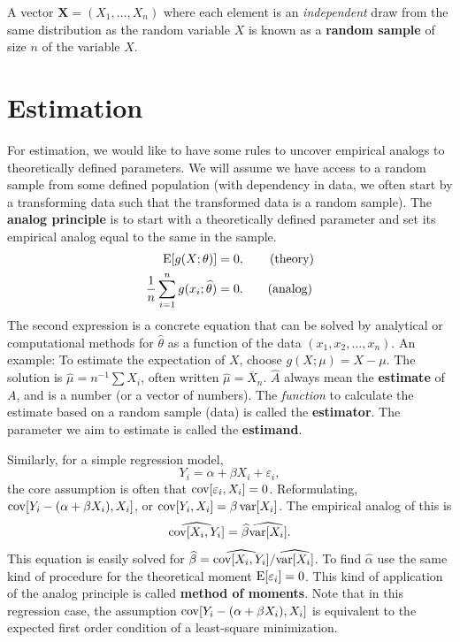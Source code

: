 \documentclass[10pt]{article}
\begin{document}
A vector $\mathbf{X}=(X_1,\dots,X_n)$ where each element is an
\emph{independent} draw from the same distribution as the random variable $X$ is
known as a \textbf{random sample} of size $n$ of the variable $X$.

\section{Estimation}

For estimation, we would like to have some rules to uncover empirical analogs
to theoretically defined parameters. We will assume we have access to a
random sample from some defined population (with dependency in data,
we often start by a transforming data such that the transformed data
is a random sample). 
The \textbf{analog principle} is to 
start with a theoretically defined parameter and set its
empirical analog equal to the same in the sample. 
\begin{align}
  \operatorname{E}[g(X;\theta)] &= 0, \tag{theory} \\
  \frac{1}{n}\sum_{i=1}^n g(x_i;\widehat{\theta}) &= 0. \tag{analog} 
\end{align}
The second expression is a concrete equation that can be solved by analytical 
or computational methods for $\widehat{\theta}$ as a function of the data $(x_1,x_2,\dots,x_n)$.
An example: To estimate the expectation of $X$, choose $g(X;\mu)=X-\mu$.
The solution is  $\widehat{\mu} = n^{-1}\sum X_i$,
often written $\widehat{\mu}=\overline{X}_n$. 
$\widehat{A}$ always mean the \textbf{estimate} of $A$, and is a number (or a vector of numbers). 
The \emph{function} to calculate the estimate based on a random sample (data) is called 
the \textbf{estimator}.  The parameter we aim to estimate is called the \textbf{estimand}.


Similarly, for a simple regression model,
\[ Y_i = \alpha + \beta X_i + \varepsilon_i,\] the core assumption is often that $\operatorname{cov}[\varepsilon_i,X_i]=0$.
Reformulating, $\operatorname{cov}[Y_i - (\alpha + \beta X_i), X_i]$, or $\operatorname{cov}[Y_i,X_i] = \beta \operatorname{var}[X_i]$.
The empirical analog of this is 
\[ \widehat{\operatorname{cov}[X_i,Y_i]} = \widehat{\beta} \widehat{\operatorname{var}[X_i]}.\]
This equation
is easily solved for $\widehat{\beta} = \widehat{\operatorname{cov}[X_i,Y_i]} / \widehat{\operatorname{var}[X_i]}$.  To find
$\widehat{\alpha}$ use the same kind of procedure for the theoretical moment $\operatorname{E}[\varepsilon_i]=0$. This kind
of application of the analog principle is called \textbf{method of moments}. Note
that in this regression case, the assumption $\operatorname{cov}[Y_i - (\alpha + \beta X_i), X_i]$ is equivalent
to the expected first order condition of a least-square minimization.
\end{document}

